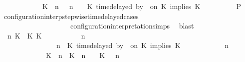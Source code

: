 \begin{isabellebody}
\ \ \ \ \ \ \ \ \ \ \ \ {\isacharparenleft}{\isacharparenleft}{\isacharparenleft}K\ {\isasymnot}{\isasymUp}\ n{\isacharparenright}\ {\isacharhash}\ {\isasymGamma}{\isacharparenright}{\isacharcomma}\ n\ {\isasymturnstile}\ {\isasymPsi}\ {\isasymtriangleright}\ {\isacharparenleft}{\isacharparenleft}K\ time{\isacharminus}delayed\ by\ {\isasymdelta}{\isasymtau}\ on\ K\ implies\ K\ {\isacharhash}\ {\isasymPhi}{\isacharparenright}{\isacharparenright}{\isacartoucheclose}\isanewline
\ \ \ \ \ \ \isamarkupfalse%
\ {\isacharquery}P\ \isamarkupfalse%
\ configuration{\isacharunderscore}interp{\isacharunderscore}stepwise{\isacharunderscore}timedelayed{\isacharunderscore}cases\isanewline
\ \ \ \ \ \ \ \ \ \ \ \ \ \ \ \ \ \ \ \ configuration{\isacharunderscore}interpretation{\isachardot}simps\ \isamarkupfalse%
\ blast\isanewline
\ \ \ \ \isamarkupfalse%
\isanewline
\ \ \ \ \ \ \isamarkupfalse%
\ {\isasymGamma}\ n\ K\ {\isasymdelta}{\isasymtau}\ K\ K\ {\isasymPsi}\ {\isasymPhi}\isanewline
\ \ \ \ \ \ \isamarkupfalse%
\ {\isacartoucheopen}{\isacharparenleft}{\isasymGamma}\ n\ {\isasymturnstile}\ {\isasymPsi}\ {\isasymtriangleright}\ {\isasymPhi}\ {\isacharequal}\isanewline
\ \ \ \ \ \ \ \ \ \ \ \ \ \ \ {\isacharparenleft}{\isasymGamma}{\isacharcomma}\ n\ {\isasymturnstile}\ {\isacharparenleft}{\isacharparenleft}K\ time{\isacharminus}delayed\ by\ {\isasymdelta}{\isasymtau}\ on\ K\ implies\ K\ {\isacharhash}\ {\isasymPsi}{\isacharparenright}\ {\isasymtriangleright}\ {\isasymPhi}{\isacharparenright}{\isacartoucheclose}\isanewline
\ \ \ \ \ \ \ {\isacartoucheopen}{\isacharparenleft}{\isasymGamma}\ n\ {\isasymturnstile}\ {\isasymPsi}\ {\isasymtriangleright}\ {\isasymPhi}\isanewline
\ \ \ \ \ \ \ \ \ \ \ \ {\isacharequal}\ {\isacharparenleft}{\isacharparenleft}{\isacharparenleft}K\ {\isasymUp}\ n{\isacharparenright}\ {\isacharhash}\ {\isacharparenleft}K\ {\isacharat}\ n\ {\isasymoplus}\ {\isasymdelta}{\isasymtau}\ {\isasymRightarrow}\ K\ {\isacharhash}\ {\isasymGamma}{\isacharparenright}{\isacharcomma}\ n\isanewline

\end{isabellebody}
